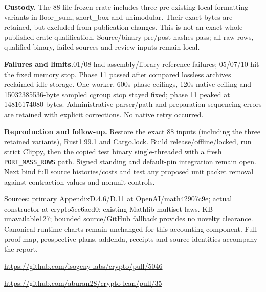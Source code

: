 \documentclass[10pt]{article}
\begin{document}
\textbf{Custody.} The 88-file frozen crate includes three pre-existing local
formatting variants in floor\_sum, short\_box and unimodular. Their exact bytes
are retained, but excluded from publication changes. This is not an exact
whole-published-crate qualification. Source/binary pre/post hashes pass; all
raw rows, qualified binary, failed sources and review inputs remain local.

\textbf{Failures and limits.}01/08 had assembly/library-reference failures;
05/07/10 hit the fixed memory stop. Phase 11 passed after compared lossless
archives reclaimed idle storage. One worker, 600s phase ceilings, 120s native
ceiling and 15032385536-byte sampled cgroup stop stayed fixed; phase 11 peaked
at 14816174080 bytes. Administrative parser/path and preparation-sequencing
errors are retained with explicit corrections. No native retry occurred.

\textbf{Reproduction and follow-up.} Restore the exact 88 inputs (including the
three retained variants), Rust1.99.1 and Cargo.lock. Build release/offline/locked,
run strict Clippy, then the copied test binary single-threaded with a fresh
\texttt{PORT\_MASS\_ROWS} path. Signed standing and default-pin integration
remain open. Next bind full source histories/costs and test any proposed unit
packet removal against contraction values and nonunit controls.

\small Sources: primary AppendixD.4.6/D.11 at OpenAI/math42907c9e; actual
constructor at crypto5ec6aed0; existing Mathlib multiset laws. KB unavailable127;
bounded source/GitHub fallback provides no novelty clearance. Canonical runtime
charts remain unchanged for this accounting component. Full proof map,
prospective plans, addenda, receipts and source identities accompany the report.\par
\url{https://github.com/isogeny-labs/crypto/pull/5046}\par
\url{https://github.com/aburan28/crypto-lean/pull/35}
\end{document}
